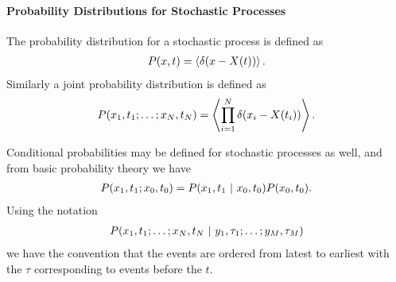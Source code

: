 \paragraph{Probability Distributions for Stochastic Processes}
The probability distribution for a stochastic process is defined as
\begin{align*}
	P(x, t) = \expval{\delta(x - X(t))}.
\end{align*}
Similarly a joint probability distribution is defined as
\begin{align*}
	P(x_{1}, t_{1}; \dots; x_{N}, t_{N}) = \expval{\prod\limits_{i = 1}^{N}\delta(x_{i} - X(t_{i}))}.
\end{align*}

Conditional probabilities may be defined for stochastic processes as well, and from basic probability theory we have
\begin{align*}
	P(x_{1}, t_{1}; x_{0}, t_{0}) = P(x_{1}, t_{1} \ | \  x_{0}, t_{0})P(x_{0}, t_{0}).
\end{align*}
Using the notation
\begin{align*}
	P(x_{1}, t_{1}; \dots; x_{N}, t_{N} \ | \  y_{1}, \tau_{1}; \dots; y_{M}, \tau_{M})
\end{align*}
we have the convention that the events are ordered from latest to earliest with the $\tau$ corresponding to events before the $t$.

